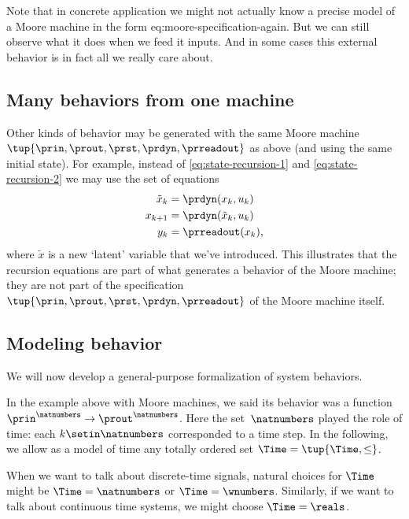 Note that in concrete application we might not actually know a precise model of a Moore machine in the form {eq:moore-specification-again}.
But we can still observe what it does when we feed it inputs.
And in some cases this external behavior is in fact all we really care about.

\subsection{Many behaviors from one machine}

Other kinds of behavior may be generated with the same Moore machine $\tup{\prin, \prout, \prst, \prdyn, \prreadout}$ as above (and using the same initial state).
For example, instead of \cref{eq:state-recursion-1} and \cref{eq:state-recursion-2} we may use the set of equations
\begin{align}
    \tilde x_{k} & = \prdyn(x_k, u_k) \\
    x_{k+1}      & = \prdyn(\tilde x_{k}, u_k) \\
    y_{k}        & = \prreadout(x_{k}),
\end{align}
where $\tilde x$ is a new `latent' variable that we've introduced.
This illustrates that the recursion equations are part of what generates a behavior of the Moore machine; they are not part of the specification $\tup{\prin, \prout, \prst, \prdyn, \prreadout}$ of the Moore machine itself.

\subsection{Modeling behavior}

We will now develop a general-purpose formalization of system behaviors.

In the example above with Moore machines, we said its behavior was a function $\prin^\natnumbers \to \prout^\natnumbers$.
Here the set~$\natnumbers$ played the role of time: each $k \setin \natnumbers$ corresponded to a time step.
In the following, we allow as a model of time any totally ordered set $\Time = \tup{\Time, \leq}$.

When we want to talk about discrete-time signals, natural choices for $\Time$ might be $\Time = \natnumbers$ or $\Time = \wnumbers$.
Similarly, if we want to talk about continuous time systems, we might choose $\Time = \reals$.

